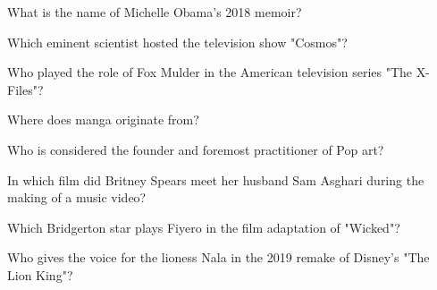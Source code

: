 \documentclass[12pt,a4paper]{book}
\begin{document}
\begin{enhancedmcq}[Question 35]{What is the name of Michelle Obama's 2018 memoir?}
\end{enhancedmcq}

\begin{enhancedmcq}[Question 36]{Which eminent scientist hosted the television show "Cosmos"?}
\end{enhancedmcq}

\begin{enhancedmcq}[Question 37]{Who played the role of Fox Mulder in the American television series "The X-Files"?}
\end{enhancedmcq}

\begin{enhancedmcq}[Question 38]{Where does manga originate from?}
\end{enhancedmcq}

\begin{enhancedmcq}[Question 39]{Who is considered the founder and foremost practitioner of Pop art?}
\end{enhancedmcq}

\begin{enhancedmcq}[Question 40]{In which film did Britney Spears meet her husband Sam Asghari during the making of a music video?}
\end{enhancedmcq}

\begin{enhancedmcq}[Question 41]{Which Bridgerton star plays Fiyero in the film adaptation of "Wicked"?}
\end{enhancedmcq}

\begin{enhancedmcq}[Question 42]{Who gives the voice for the lioness Nala in the 2019 remake of Disney's "The Lion King"?}
\end{enhancedmcq}
\end{document}
